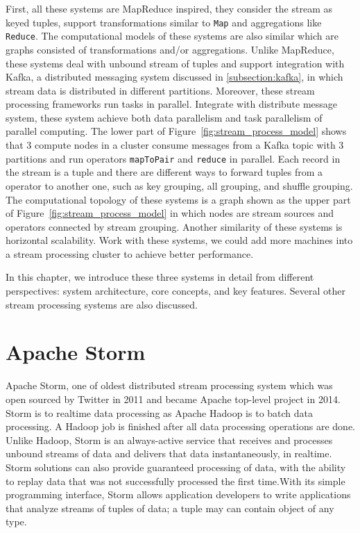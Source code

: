 First, all these systems are MapReduce inspired, they consider the stream as keyed tuples, support transformations similar to \texttt{Map} and aggregations like \texttt{Reduce}. The computational models of these systems are also similar which are graphs consisted of transformations and/or aggregations. Unlike MapReduce, these systems deal with unbound stream of tuples and support integration with Kafka, a distributed messaging system discussed in \cref{subsection:kafka}, in which stream data is distributed in different partitions. Moreover, these stream processing frameworks run tasks in parallel. Integrate with distribute message system, these system achieve both data parallelism and task parallelism of parallel computing. The lower part of Figure~\ref{fig:stream_process_model} shows that 3 compute nodes in a cluster consume messages from a Kafka topic with 3 partitions and run operators \texttt{mapToPair} and \texttt{reduce} in parallel. Each record in the stream is a tuple and there are different ways to forward tuples from a operator to another one, such as key grouping, all grouping, and shuffle grouping.  The computational topology of these systems is a graph shown as the upper part of Figure~\ref{fig:stream_process_model} in which nodes are stream sources and operators connected by stream grouping. Another similarity of these systems is horizontal scalability. Work with these systems, we could add more machines into a stream processing cluster to achieve better performance.


In this chapter, we introduce these three systems in detail from different perspectives: system architecture, core concepts, and key features. Several other stream processing systems are also discussed. 
 
\section{Apache Storm}
Apache Storm, one of oldest distributed stream processing system which was open sourced by Twitter in 2011 and became Apache top-level project in 2014.  Storm is to realtime data processing as Apache Hadoop is to batch data processing. A Hadoop job is finished after all data processing operations are done. Unlike Hadoop, Storm is an always-active service that receives and processes unbound streams of data and delivers that data instantaneously, in realtime. Storm solutions can also provide guaranteed processing of data, with the ability to replay data that was not successfully processed the first time.With its simple programming interface, Storm allows application developers to write applications that analyze streams of tuples of data; a tuple may can contain object of any type.

